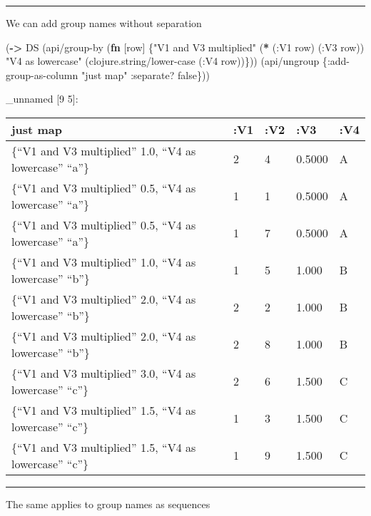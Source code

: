 \documentclass[]{article}
\newenvironment{Shaded}{\begin{snugshade}}{\end{snugshade}}
\newcommand{\KeywordTok}[1]{\textcolor[rgb]{0.13,0.29,0.53}{\textbf{#1}}}
\newcommand{\StringTok}[1]{\textcolor[rgb]{0.31,0.60,0.02}{#1}}
\newcommand{\VariableTok}[1]{\textcolor[rgb]{0.00,0.00,0.00}{#1}}
\newcommand{\AttributeTok}[1]{\textcolor[rgb]{0.77,0.63,0.00}{#1}}
\newcommand{\NormalTok}[1]{#1}
\begin{document}
\begin{center}\rule{0.5\linewidth}{0.5pt}\end{center}

We can add group names without separation

\begin{Shaded}
\begin{Highlighting}[]
\NormalTok{(}\KeywordTok{->}\NormalTok{ DS}
\NormalTok{    (api/group-by (}\KeywordTok{fn}\NormalTok{ [row] \{}\StringTok{"V1 and V3 multiplied"}\NormalTok{ (}\KeywordTok{*}\NormalTok{ (}\AttributeTok{:V1}\NormalTok{ row)}
\NormalTok{                                                      (}\AttributeTok{:V3}\NormalTok{ row))}
                            \StringTok{"V4 as lowercase"}\NormalTok{ (clojure.string/lower-case (}\AttributeTok{:V4}\NormalTok{ row))\}))}
\NormalTok{    (api/ungroup \{}\AttributeTok{:add-group-as-column} \StringTok{"just map"}
                  \AttributeTok{:separate}\NormalTok{? }\VariableTok{false}\NormalTok{\}))}
\end{Highlighting}
\end{Shaded}

\_unnamed {[}9 5{]}:

\begin{longtable}[]{@{}lllll@{}}
\toprule
just map & :V1 & :V2 & :V3 & :V4\tabularnewline
\midrule
\endhead
\{``V1 and V3 multiplied'' 1.0, ``V4 as lowercase'' ``a''\} & 2 & 4 &
0.5000 & A\tabularnewline
\{``V1 and V3 multiplied'' 0.5, ``V4 as lowercase'' ``a''\} & 1 & 1 &
0.5000 & A\tabularnewline
\{``V1 and V3 multiplied'' 0.5, ``V4 as lowercase'' ``a''\} & 1 & 7 &
0.5000 & A\tabularnewline
\{``V1 and V3 multiplied'' 1.0, ``V4 as lowercase'' ``b''\} & 1 & 5 &
1.000 & B\tabularnewline
\{``V1 and V3 multiplied'' 2.0, ``V4 as lowercase'' ``b''\} & 2 & 2 &
1.000 & B\tabularnewline
\{``V1 and V3 multiplied'' 2.0, ``V4 as lowercase'' ``b''\} & 2 & 8 &
1.000 & B\tabularnewline
\{``V1 and V3 multiplied'' 3.0, ``V4 as lowercase'' ``c''\} & 2 & 6 &
1.500 & C\tabularnewline
\{``V1 and V3 multiplied'' 1.5, ``V4 as lowercase'' ``c''\} & 1 & 3 &
1.500 & C\tabularnewline
\{``V1 and V3 multiplied'' 1.5, ``V4 as lowercase'' ``c''\} & 1 & 9 &
1.500 & C\tabularnewline
\bottomrule
\end{longtable}

\begin{center}\rule{0.5\linewidth}{0.5pt}\end{center}

The same applies to group names as sequences
\end{document}
